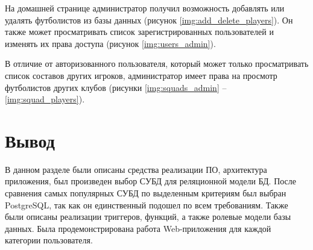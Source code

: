 На домашней странице администратор получил возможность добавлять или удалять футболистов из базы данных (рисунок \ref{img:add_delete_players}). Он также может просматривать список зарегистрированных пользователей и изменять их права доступа (рисунок \ref{img:users_admin}).


\clearpage

В отличие от авторизованного пользователя, который может только просматривать список составов других игроков, администратор имеет права на просмотр футболистов других клубов (рисунки \ref{img:squads_admin} -- \ref{img:squad_players}).


\clearpage

\section{Вывод}

В данном разделе были описаны средства реализации ПО, архитектура приложения, был произведен выбор СУБД для реляционной модели БД. После сравнения самых популярных СУБД по выделенным критериям был выбран PostgreSQL, так как он единственный подошел по всем требованиям. Также были описаны реализации триггеров, функций, а также ролевые модели базы данных. Была продемонстрирована работа Web-приложения для каждой категории пользователя.

